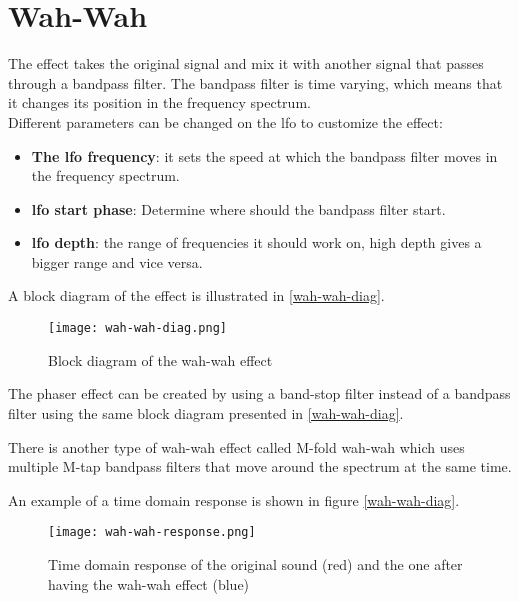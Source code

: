 \section{Wah-Wah}

The effect takes the original signal and mix it with another signal that passes through a bandpass filter. The bandpass filter is time varying, which means that it changes its position in the frequency spectrum. \\
Different parameters can be changed on the \gls{lfo} to customize the effect:\\

\begin{itemize}
	\item \textbf{The \gls{lfo} frequency}: it sets the speed at which the bandpass filter moves in the frequency spectrum.
	\item \textbf{\gls{lfo} start phase}: Determine where should the bandpass filter start.
	\item \textbf{\gls{lfo} depth}: the range of frequencies it should work on, high depth gives a bigger range and vice versa.
\end{itemize}

A block diagram of the effect is illustrated in \autoref{wah-wah-diag}.  

\begin{figure} [htbp]
	\centering
	\texttt{[image: wah-wah-diag.png]}
	\caption{Block diagram of the wah-wah effect}
	\label{wah-wah-diag}
\end{figure}

The phaser effect can be created by using a band-stop filter instead of a bandpass filter using the same block diagram presented in \autoref{wah-wah-diag}.

There is another type of wah-wah effect called M-fold wah-wah which uses multiple M-tap bandpass filters that move around the spectrum at the same time.

An example of a time domain response is shown in figure \autoref{wah-wah-diag}.

\begin{figure} [htbp]
	\centering
	\texttt{[image: wah-wah-response.png]}
	\caption{Time domain response of the original sound (red) and the one after having the wah-wah effect (blue)}
	\label{wah-wah-diag}
\end{figure}


